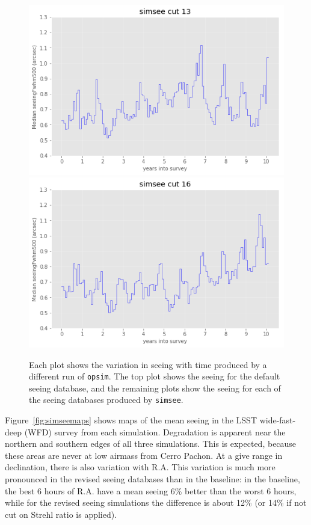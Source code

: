 \documentclass[DM,authoryear,toc]{lsstdoc}
\begin{document}
\begin{figure}
\endminipage\hfill
{}
  \includegraphics[width=\columnwidth]{./figures/seeing_ss58779y13_v1_3_10yrs.png}
\endminipage\hfill
{}
  \includegraphics[width=\columnwidth]{./figures/seeing_ss58779y16_v1_3_10yrs.png}
\endminipage\hfill
  \caption{Each plot shows the variation in seeing with time
    produced by a different run of \texttt{opsim}. The top plot
    shows the seeing for the default seeing database, and the
    remaining plots show the seeing for each of the seeing databases
    produced by \texttt{simsee}.} 
  \label{fig:simseecomp}
\end{figure}

Figure~\ref{fig:simseemaps} shows maps of the mean seeing in the LSST
wide-fast-deep (WFD) survey from each simulation. Degradation is
apparent near the northern and southern edges of all three
simulations. This is expected, because these areas are never at low
airmass from Cerro Pachon. At a give range in declination, there is
also variation with R.A. This variation is much more pronounced in the
revised seeing databases than in the baseline: in the baseline, the
best 6 hours of R.A. have a mean seeing 6\% better than the worst 6
hours, while for the revised seeing simulations the difference is
about 12\% (or 14\% if not cut on Strehl ratio is applied). 
\end{document}
